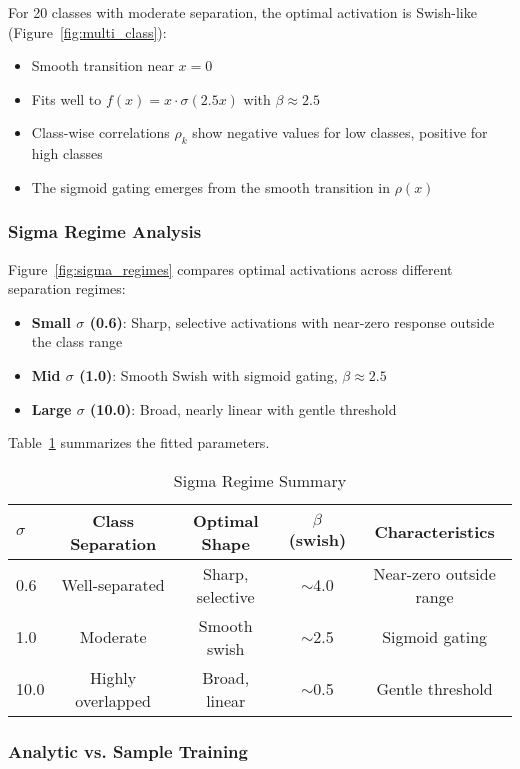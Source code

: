 \documentclass{article}
\begin{document}
For 20 classes with moderate separation, the optimal activation is Swish-like (Figure~\ref{fig:multi_class}):
\begin{itemize}
\item Smooth transition near $x=0$
\item Fits well to $f(x) = x \cdot \sigma(2.5x)$ with $\beta \approx 2.5$
\item Class-wise correlations $\rho_k$ show negative values for low classes, positive for high classes
\item The sigmoid gating emerges from the smooth transition in $\rho(x)$
\end{itemize}

\subsubsection{Sigma Regime Analysis}

Figure~\ref{fig:sigma_regimes} compares optimal activations across different separation regimes:
\begin{itemize}
\item \textbf{Small $\sigma$ (0.6)}: Sharp, selective activations with near-zero response outside the class range
\item \textbf{Mid $\sigma$ (1.0)}: Smooth Swish with sigmoid gating, $\beta \approx 2.5$
\item \textbf{Large $\sigma$ (10.0)}: Broad, nearly linear with gentle threshold
\end{itemize}

Table~\ref{tab:sigma_summary} summarizes the fitted parameters.

\begin{table}[t]
\centering
\caption{Sigma Regime Summary}
\label{tab:sigma_summary}
\begin{tabular}{lcccc}
\hline
$\sigma$ & Class Separation & Optimal Shape & $\beta$ (swish) & Characteristics \\
\hline
0.6 & Well-separated & Sharp, selective & $\sim$4.0 & Near-zero outside range \\
1.0 & Moderate & Smooth swish & $\sim$2.5 & Sigmoid gating \\
10.0 & Highly overlapped & Broad, linear & $\sim$0.5 & Gentle threshold \\
\hline
\end{tabular}
\end{table}

\subsubsection{Analytic vs. Sample Training}
\end{document}
